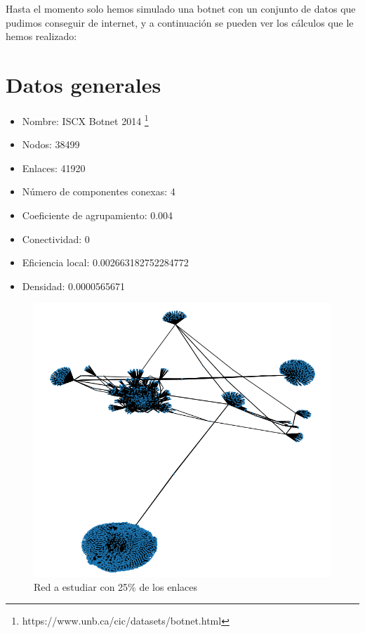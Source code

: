 \documentclass[12pt]{extreport}
\begin{document}
	Hasta el momento solo hemos simulado una botnet con un conjunto de datos que pudimos conseguir de internet, y a continuación se pueden ver los cálculos que le hemos realizado:
    \section*{Datos generales}

    \begin{itemize}
        \item Nombre: ISCX Botnet 2014 
        \footnote{https://www.unb.ca/cic/datasets/botnet.html}

        \item Nodos: 38499

        \item Enlaces: 41920

        \item Número de componentes conexas: 4

        \item Coeficiente de agrupamiento: 0.004

        \item Conectividad: 0

        \item Eficiencia local: 0.002663182752284772

        \item Densidad: 0.0000565671
    \end{itemize}

    \begin{figure}[H]
        \centering
        \includegraphics[scale=0.75]{net25.png}
        \caption{Red a estudiar con 25\% de los enlaces}
        \label{fig:net25}
    \end{figure}
\end{document}
